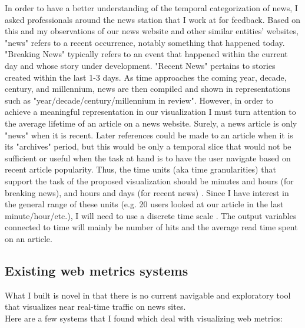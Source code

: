 \documentclass[12pt]{article}
\begin{document}
In order to have a better understanding of the temporal categorization of news, I asked professionals around the news station that I work at for feedback. Based on this and my observations of our news website and other similar entities' websites, "news" refers to a recent occurrence, notably something that happened today. "Breaking News" typically refers to an event that happened within the current day and whose story under development. "Recent News" pertains to stories created within the last 1-3 days. As time approaches the coming year, decade, century, and millennium, news are then compiled and shown in representations such as "year/decade/century/millennium in review". However, in order to achieve a meaningful representation in our visualization I must turn attention to the average lifetime of an article on a news website. Surely, a news article is only "news" when it is recent. Later references could be made to an article when it is its "archives" period, but this would be only a temporal slice that would not be sufficient or useful when the task at hand is to have the user navigate based on recent article popularity. Thus, the time units (aka time granularities) that support the task of the proposed visualization should be minutes and hours (for breaking news), and hours and days (for recent news) \cite{bettini}. Since I have interest in the general range of these units (e.g. 20 users looked at our article in the last minute/hour/etc.), I will need to use a discrete time scale \cite{goralwalla}. The output variables connected to time will mainly be number of hits and the average read time spent on an article.

\subsection{Existing web metrics systems}
What I built is novel in that there is no current navigable and exploratory tool that visualizes near real-time traffic on news sites. \\
Here are a few systems that I found which deal with visualizing web metrics: \\
\end{document}

